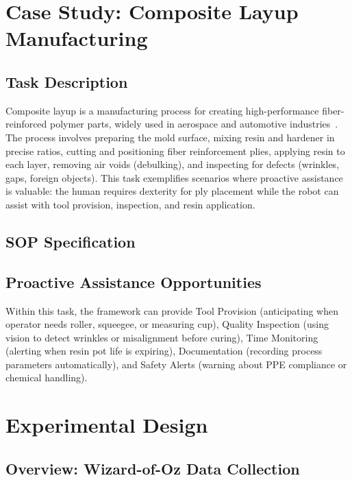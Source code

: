 \documentclass[sensors,article,submit,pdftex,moreauthors]{Definitions/mdpi}
\begin{document}
\section{Case Study: Composite Layup Manufacturing}

\subsection{Task Description}

Composite layup is a manufacturing process for creating high-performance fiber-reinforced polymer parts, widely used in aerospace and automotive industries~\cite{Makris2023, Manyar2023}. The process involves preparing the mold surface, mixing resin and hardener in precise ratios, cutting and positioning fiber reinforcement plies, applying resin to each layer, removing air voids (debulking), and inspecting for defects (wrinkles, gaps, foreign objects). This task exemplifies scenarios where proactive assistance is valuable: the human requires dexterity for ply placement while the robot can assist with tool provision, inspection, and resin application.

\subsection{SOP Specification}


\subsection{Proactive Assistance Opportunities}

Within this task, the framework can provide Tool Provision (anticipating when operator needs roller, squeegee, or measuring cup), Quality Inspection (using vision to detect wrinkles or misalignment before curing), Time Monitoring (alerting when resin pot life is expiring), Documentation (recording process parameters automatically), and Safety Alerts (warning about PPE compliance or chemical handling).

\section{Experimental Design}

\subsection{Overview: Wizard-of-Oz Data Collection}
\end{document}
